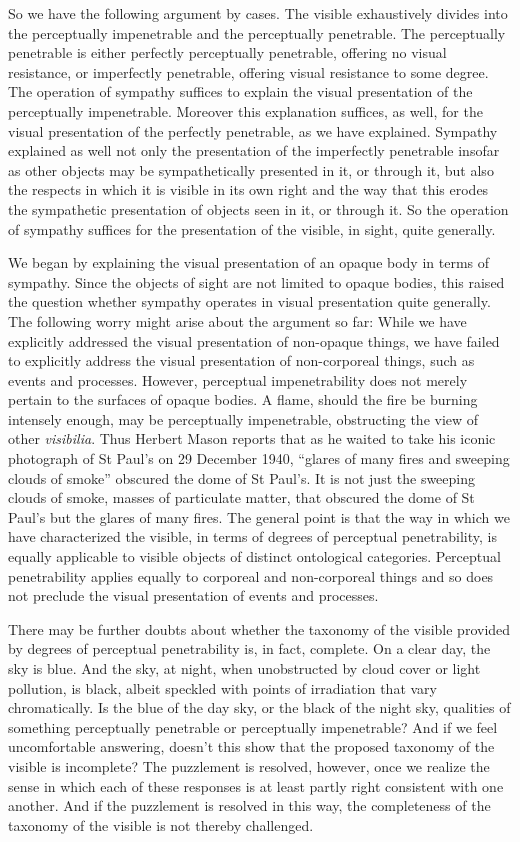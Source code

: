 So we have the following argument by cases. The visible exhaustively divides into the perceptually impenetrable and the perceptually penetrable. The perceptually penetrable is either perfectly perceptually penetrable, offering no visual resistance, or imperfectly penetrable, offering visual resistance to some degree. The operation of sympathy suffices to explain the visual presentation of the perceptually impenetrable. Moreover this explanation suffices, as well, for the visual presentation of the perfectly penetrable, as we have explained. Sympathy explained as well not only the presentation of the imperfectly penetrable insofar as other objects may be sympathetically presented in it, or through it, but also the respects in which it is visible in its own right and the way that this erodes the sympathetic presentation of objects seen in it, or through it. So the operation of sympathy suffices for the presentation of the visible, in sight, quite generally.

We began by explaining the visual presentation of an opaque body in terms of sympathy. Since the objects of sight are not limited to opaque bodies, this raised the question whether sympathy operates in visual presentation quite generally. The following worry might arise about the argument so far: While we have explicitly addressed the visual presentation of non-opaque things, we have failed to explicitly address the visual presentation of non-corporeal things, such as events and processes. However, perceptual impenetrability does not merely pertain to the surfaces of opaque bodies. A flame, should the fire be burning intensely enough, may be perceptually impenetrable, obstructing the view of other \emph{visibilia}. Thus Herbert Mason reports that as he waited to take his iconic photograph of St Paul's on 29 December 1940, ``glares of many fires and sweeping clouds of smoke'' obscured the dome of St Paul's. It is not just the sweeping clouds of smoke, masses of particulate matter, that obscured the dome of St Paul's but the glares of many fires. The general point is that the way in which we have characterized the visible, in terms of degrees of perceptual penetrability, is equally applicable to visible objects of distinct ontological categories. Perceptual penetrability applies equally to corporeal and non-corporeal things and so does not preclude the visual presentation of events and processes.

There may be further doubts about whether the taxonomy of the visible provided by degrees of perceptual penetrability is, in fact, complete. On a clear day, the sky is blue. And the sky, at night, when unobstructed by cloud cover or  light pollution, is black, albeit speckled with points of irradiation that vary chromatically. Is the blue of the day sky, or the black of the night sky, qualities of something perceptually penetrable or perceptually impenetrable? And if we feel uncomfortable answering, doesn't this show that the proposed taxonomy of the visible is incomplete? The puzzlement is resolved, however, once we realize the sense in which each of these responses is at least partly right consistent with one another. And if the puzzlement is resolved in this way, the completeness of the taxonomy of the visible is not thereby challenged.

